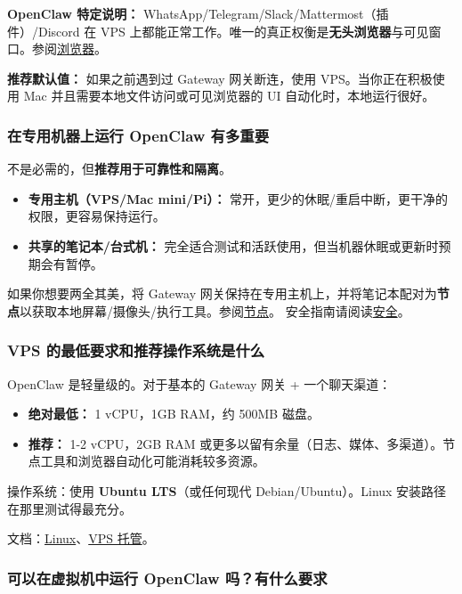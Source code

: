 \textbf{OpenClaw 特定说明：} WhatsApp/Telegram/Slack/Mattermost（插件）/Discord 在 VPS 上都能正常工作。唯一的真正权衡是\textbf{无头浏览器}与可见窗口。参阅\href{/tools/browser}{浏览器}。

\textbf{推荐默认值：} 如果之前遇到过 Gateway 网关断连，使用 VPS。当你正在积极使用 Mac 并且需要本地文件访问或可见浏览器的 UI 自动化时，本地运行很好。

\subsubsection{在专用机器上运行 OpenClaw 有多重要}


不是必需的，但\textbf{推荐用于可靠性和隔离}。

\begin{itemize}
  \item \textbf{专用主机（VPS/Mac mini/Pi）：} 常开，更少的休眠/重启中断，更干净的权限，更容易保持运行。
  \item \textbf{共享的笔记本/台式机：} 完全适合测试和活跃使用，但当机器休眠或更新时预期会有暂停。
\end{itemize}


如果你想要两全其美，将 Gateway 网关保持在专用主机上，并将笔记本配对为\textbf{节点}以获取本地屏幕/摄像头/执行工具。参阅\href{/nodes}{节点}。
安全指南请阅读\href{/gateway/security}{安全}。

\subsubsection{VPS 的最低要求和推荐操作系统是什么}


OpenClaw 是轻量级的。对于基本的 Gateway 网关 + 一个聊天渠道：

\begin{itemize}
  \item \textbf{绝对最低：} 1 vCPU，1GB RAM，约 500MB 磁盘。
  \item \textbf{推荐：} 1-2 vCPU，2GB RAM 或更多以留有余量（日志、媒体、多渠道）。节点工具和浏览器自动化可能消耗较多资源。
\end{itemize}


操作系统：使用 \textbf{Ubuntu LTS}（或任何现代 Debian/Ubuntu）。Linux 安装路径在那里测试得最充分。

文档：\href{/platforms/linux}{Linux}、\href{/vps}{VPS 托管}。

\subsubsection{可以在虚拟机中运行 OpenClaw 吗？有什么要求}


